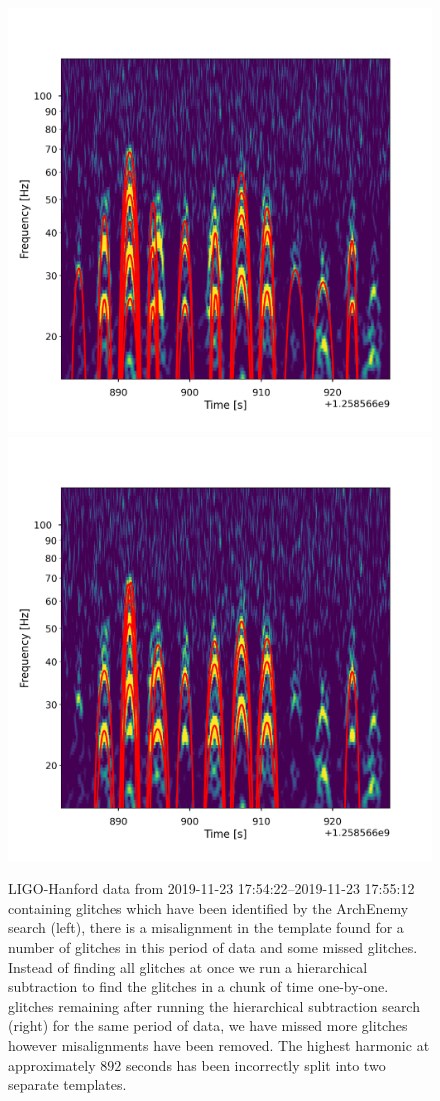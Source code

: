 \begin{figure}
     \centering
     \begin{minipage}[t]{1.0\linewidth}
        \includegraphics[width=0.49\linewidth]{images/4_archenemy/Section3/3.6/overlay_good_overlays_first.pdf}
        \hspace{0.02\linewidth}
        \includegraphics[width=0.49\linewidth]{images/4_archenemy/Section3/3.6/overlay_good_overlays_second.pdf}
     \end{minipage}
         \caption{LIGO-Hanford data from 2019-11-23 17:54:22--2019-11-23 17:55:12 containing \scladj glitches which have been identified by the ArchEnemy search (left), there is a misalignment in the template found for a number of glitches in this period of data and some missed glitches. Instead of finding all \scladj glitches at once we run a hierarchical subtraction to find the \scladj glitches in a chunk of time one-by-one. \Scladj glitches remaining after running the hierarchical subtraction search (right) for the same period of data, we have missed more \scladj glitches however misalignments have been removed. The highest harmonic at approximately $892$ seconds has been incorrectly split into two separate templates.}
    \label{4:fig:overlay_goods}
\end{figure}

